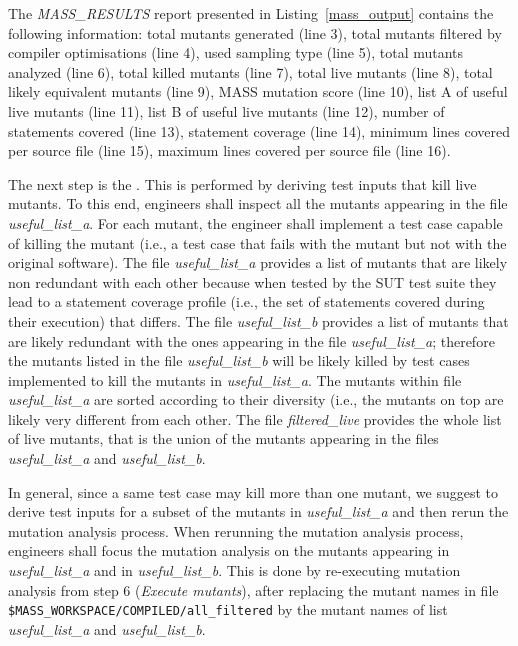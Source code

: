 The \emph{MASS\_RESULTS} report presented in Listing~\ref{mass_output} contains the following information: total mutants generated (line 3), total mutants filtered by compiler optimisations (line 4), used sampling type (line 5), total mutants analyzed (line 6), total killed mutants (line 7), total live mutants (line 8), total likely equivalent mutants (line 9), MASS mutation score (line 10), list A of useful live mutants (line 11), list B of useful live mutants (line 12), number of statements covered (line 13), statement coverage (line 14), minimum lines covered per source file (line 15), maximum lines covered per source file (line 16). 
\ENDCHANGEDFINAL

The next step is the . This is performed by deriving test inputs that kill live mutants.
To this end, engineers shall inspect all the mutants appearing in the file \emph{useful\_list\_a}. For each mutant, the engineer shall implement a test case capable of killing the mutant (i.e., a test case that fails with the mutant but not with the original software).
The file \emph{useful\_list\_a} provides a list of mutants that are likely non redundant with each other because when tested by the SUT test suite they lead to a statement coverage profile (i.e., the set of statements covered during their execution) that differs.
The file \emph{useful\_list\_b} provides a list of mutants that are likely redundant with the ones appearing in the file \emph{useful\_list\_a}; therefore the mutants listed in the file \emph{useful\_list\_b} will be likely killed by test cases implemented to kill the mutants in \emph{useful\_list\_a}.
The mutants within file \emph{useful\_list\_a} are sorted according to their diversity (i.e., the mutants on top are likely very different from each other.
The file \emph{filtered\_live} provides the whole list of live mutants, that is the union of the mutants appearing in the files
\emph{useful\_list\_a} and \emph{useful\_list\_b}.

In general, since a same test case may kill more than one mutant, we suggest to derive test inputs for a subset of the mutants in \emph{useful\_list\_a} and then rerun the mutation analysis process. When rerunning the mutation analysis process, engineers shall focus the mutation analysis on the mutants appearing in \emph{useful\_list\_a} and in \emph{useful\_list\_b}. This is done by re-executing mutation analysis from step 6 (\emph{Execute mutants}), after replacing the mutant names in file \texttt{\$MASS\_WORKSPACE/COMPILED/all\_filtered} by the mutant names of list \emph{useful\_list\_a} and \emph{useful\_list\_b}.

